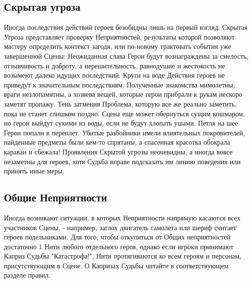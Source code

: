 \subsection{Скрытая угроза}
Иногда последствия действий героев безобидны лишь на первый взгляд. Скрытая Угроза представляет проверку Неприятностей, результаты которой позволяют мастеру определить контекст загодя, или по-новому трактовать события уже завершенной Сцены:
\trouble
{Неожиданная слава}%
{Герои будут вознаграждены за смелость, отзывчивость и доброту, а нерешительность, равнодушие и жестокость не возымеют далеко идущих последствий.}%
{Круги на воде}%
{Действия героев не приведут к значительным последствиям. Полученные знакомства мимолетны, враги незлопамятны, а хозяева вещей, которые герои прибрали к рукам нескоро заметят пропажу.}%
{Тень затмения}%
{Проблема, которую все же реально заметить, пока не станет слишком поздно. Сцена еще может обернуться сущим кошмаром, но герои выйдут сухими из воды, если не будут хлопать ушами.}%
{Петля на шее}%
{Герои попали в переплет. Убитые разбойники имели влиятельных покровителей, найденные предметы были кем-то спрятаны, а спасенная красотка обокрала караван и сбежала!}%
Проявления Скрытой угрозы неочевидны, а иногда вовсе незаметны для героев, хотя Судьба вправе подсказать им линию поведения или принять иные меры. 

\subsection{Общие Неприятности}
Иногда возникают ситуации, в которых Неприятности напрямую касаются всех участников Сцены, - например, заглох двигатель самолета или шериф считает героев подельниками.
\newline Для того, чтобы откупиться от Общих неприятностей достаточно 1 Нити любого отдельного героя, однако если игроки принимают Каприз Судьбы "Катастрофа!", Нити протягиваются ко всем героям и \tbd персонам, присутствующим в Сцене. О Капризах Судьбы читайте в соответствующем разделе правил.


